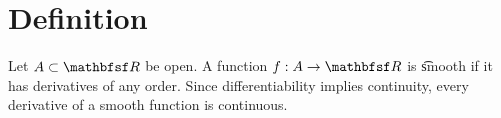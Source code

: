 
\section*{Definition}

Let $A \subset \R $ be open.
A function $f: A \to \R $ is \t{smooth} if it has derivatives of any order.
Since differentiability implies continuity, every derivative of a smooth function is continuous.

\blankpage